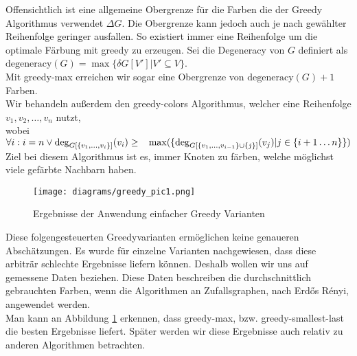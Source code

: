 \documentclass[11pt]{article}
\newcommand{\degeneracy}{\text{degeneracy}}
\begin{document}
Offensichtlich ist eine allgemeine Obergrenze für die Farben die der Greedy Algorithmus verwendet $\Delta G$.
Die Obergrenze kann jedoch auch je nach gewählter Reihenfolge geringer ausfallen. 
So existiert immer eine Reihenfolge um die optimale Färbung mit greedy zu erzeugen.
Sei die Degeneracy von $G$ definiert als\\
$\degeneracy(G)=\max\{\delta G[V']|V'\subseteq V\}$.\\
Mit greedy-max erreichen wir sogar eine Obergrenze von $\degeneracy(G)+1$ Farben.\\
Wir behandeln außerdem den greedy-colors Algorithmus, 
welcher eine Reihenfolge $v_1,v_2,\ldots,v_n$ nutzt,\\ 
wobei $\forall i: i=n\lor
\deg_{G[\{v_1,\ldots,v_i\}]}(v_i)\geq\\
\ \ \max(\{\deg_{G[\{v_1,\ldots,v_{i-1}\}\cup\{j\}]}(v_j)|j\in\{i+1\ldots n\}\})$
Ziel bei diesem Algorithmus ist es, immer Knoten zu färben, welche möglichst viele gefärbte Nachbarn haben.
\begin{figure}
  \texttt{[image: diagrams/greedy\_pic1.png]}
  \caption{Ergebnisse der Anwendung einfacher Greedy Varianten}
  \label{fig:greedy1}
\end{figure}
Diese folgengesteuerten Greedyvarianten ermöglichen keine genaueren Abschätzungen.
Es wurde für einzelne Varianten nachgewiesen, dass diese arbiträr schlechte Ergebnisse liefern können.\cite{geedy_mitchem}
Deshalb wollen wir uns auf gemessene Daten beziehen. Diese Daten beschreiben die durchschnittlich gebrauchten Farben, wenn die Algorithmen an Zufallsgraphen, nach Erdős Rényi, angewendet werden.\cite{geedy_erdos_renyi}\\
Man kann an Abbildung \ref{fig:greedy1} erkennen, 
dass greedy-max, bzw. greedy-smallest-last die besten Ergebnisse liefert. Später werden wir diese Ergebnisse auch relativ zu anderen Algorithmen betrachten.
\end{document}
